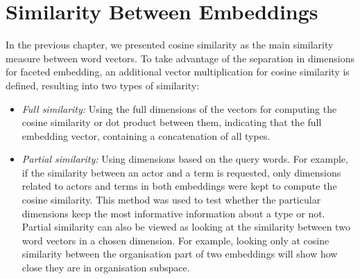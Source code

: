 \section{Similarity Between Embeddings }
In the previous chapter, we presented cosine similarity as the main similarity measure between word vectors. To take advantage of the separation in dimensions for faceted embedding, an additional vector multiplication for cosine similarity is defined, resulting into two types of similarity:  
\begin{itemize}
\item \emph{Full similarity:} Using the full dimensions of the vectors for computing the cosine similarity or dot product between them, indicating that the full embedding vector, containing a concatenation of all types. 
\item \emph{Partial similarity:} Using dimensions based on the query words. For example, if the similarity between an actor and a term is requested, only dimensions related to actors and terms in both embeddings were kept to compute the cosine similarity. This method was used to test whether the particular dimensions keep the most informative information about a type or not. Partial similarity can also be viewed as looking at the similarity between two word vectors in a chosen dimension. For example, looking only at cosine similarity between the organisation part of two embeddings will show how close they are in organisation subspace. 
\end{itemize}






